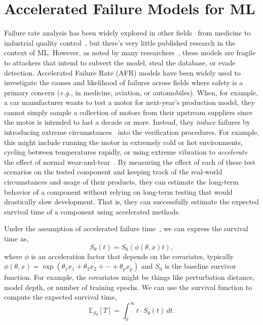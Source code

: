 
\section{Accelerated Failure Models for ML}
\label{afr_models}
Failure rate analysis has been widely explored in other fields~\citep{aft_models} from medicine to industrial quality control~\citep{ai_medical_imaging,ai_industry,ai_aviation,ai_luggage,ai_security,ai_prison}, but there's very little published research in the context of ML. However, as noted by many researchers~\citep{madry2017towards, carlini_towards_2017, croce_reliable_2020, meyers}, these models are fragile to attackers that intend to subvert the model, steal the database, or evade detection.  Accelerated Failure Rate (AFR) models have been widely used to investigate the causes and likelihood of failures across fields where safety is a primary concern (\textit{e.g.}, in medicine, aviation, or automobiles). When, for example, a car manufacturer wants to test a motor for next-year's production model, they cannot simply sample a collection of motors from their upstream suppliers since the motor is intended to last a decade or more. Instead, they \textit{induce} failures by introducing extreme circumstances~\citep{liu2013development,lawless1995methods} into the verification procedures. For example, this might include running the motor in extremely cold or hot environments, cycling between temperatures rapidly, or using extreme vibration to \textit{accelerate} the effect of normal wear-and-tear~\citep{meeker1998accelerated}. By measuring the effect of each of these test scenarios on the tested component and keeping track of the real-world circumstances and usage of their products, they can estimate the long-term behavior of a component without relying on long-term testing that would drastically slow development. That is, they can successfully estimate the expected survival time of a component using accelerated methods.

Under the assumption of accelerated failure time~\cite{kleinbaum1996survival}, we can express the survival time as,
$$
	S_\theta(t) = S_0(\phi(\theta, x) t),
$$
where $\phi$ is an acceleration factor that depends on the covariates, typically $\phi(\theta, x) = \exp{(\theta_1 x_1 + \theta_2 x_2 + \cdots + \theta_p x_p)}$ and $S_0$ is the baseline survivor function. For example, the covariates might be things like perturbation distance, model depth, or number of training epochs. We can use the survival function to compute the expected survival time,
\[
	\mathbb{E}_{S_\theta}[T] = \int_0^{\infty} t \cdot S_\theta(t) \,dt.
\]

